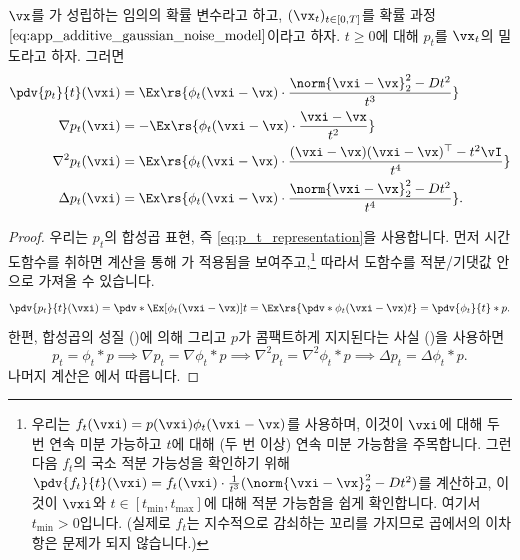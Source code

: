 \documentclass[../../book-main_ko.tex]{subfiles}
\begin{document}
\begin{proposition}\label{prop:p_t_derivatives}
    \(\vx\)를 가 성립하는 임의의 확률 변수라고 하고, \((\vx_{t})_{t \in [0, T]}\)를 확률 과정 \(\eqref{eq:app_additive_gaussian_noise_model}\)이라고 하자. \(t \geq 0\)에 대해 \(p_{t}\)를 \(\vx_{t}\)의 밀도라고 하자. 그러면
    \begin{align}
        \pdv{p_{t}}{t}(\vxi)
        &= \Ex\rs{\phi_{t}(\vxi - \vx)\cdot\frac{\norm{\vxi - \vx}_{2}^{2} - Dt^{2}}{t^{3}}} \\
        \nabla p_{t}(\vxi)
        &= -\Ex\rs{\phi_{t}(\vxi - \vx)\cdot\frac{\vxi - \vx}{t^{2}}} \\
        \nabla^{2}p_{t}(\vxi)
        &= \Ex\rs{\phi_{t}(\vxi - \vx)\cdot\frac{(\vxi - \vx)(\vxi - \vx)^{\top} - t^{2}\vI}{t^{4}}} \\
        \Delta p_{t}(\vxi)
        &= \Ex\rs{\phi_{t}(\vxi - \vx)\cdot\frac{\norm{\vxi - \vx}_{2}^{2} - Dt^{2}}{t^{4}}}.
    \end{align}
\end{proposition}
\begin{proof}
    우리는 \(p_{t}\)의 합성곱 표현, 즉 \eqref{eq:p_t_representation}을 사용합니다. 먼저 시간 도함수를 취하면 계산을 통해 가 적용됨을 보여주고,\footnote{우리는 \(f_{t}(\vxi) = p(\vxi) \phi_{t}(\vxi - \vx)\)를 사용하며, 이것이 \(\vxi\)에 대해 두 번 연속 미분 가능하고 \(t\)에 대해 (두 번 이상) 연속 미분 가능함을 주목합니다. 그런 다음 \(f_{t}\)의 국소 적분 가능성을 확인하기 위해 \(\pdv{f_{t}}{t}(\vxi) = f_{t}(\vxi)\cdot \frac{1}{t^{3}}(\norm{\vxi - \vx}_{2}^{2} - Dt^{2})\)를 계산하고, 이것이 \(\vxi\)와 \(t \in [t_{\min}, t_{\max}]\)에 대해 적분 가능함을 쉽게 확인합니다. 여기서 \(t_{\min} > 0\)입니다. (실제로 \(f_{t}\)는 지수적으로 감쇠하는 꼬리를 가지므로 곱에서의 이차 항은 문제가 되지 않습니다.)} 따라서 도함수를 적분/기댓값 안으로 가져올 수 있습니다.
    \begin{equation}
        \pdv{p_{t}}{t}(\vxi) = \pdv*{\Ex[\phi_{t}(\vxi - \vx)]}{t} = \Ex\rs{\pdv*{\phi_{t}(\vxi - \vx)}{t}} = \pdv{\phi_{t}}{t} * p.
    \end{equation}
    한편, 합성곱의 성질 ()에 의해 그리고 \(p\)가 콤팩트하게 지지된다는 사실 ()을 사용하면
    \begin{equation}
        p_{t} = \phi_{t} * p \implies \nabla p_{t} = \nabla \phi_{t} * p \implies \nabla^{2}p_{t} = \nabla^{2}\phi_{t} * p \implies \Delta p_{t} = \Delta \phi_{t} * p.
    \end{equation}
    나머지 계산은 에서 따릅니다.
\end{proof}
\end{document}
